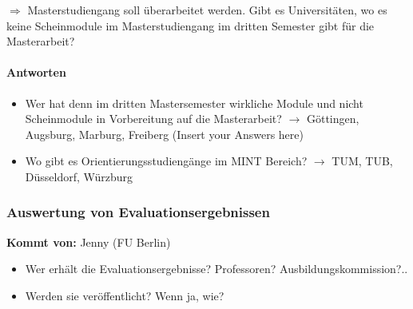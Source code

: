       $\Rightarrow$ Masterstudiengang soll überarbeitet werden. Gibt es Universitäten, wo es keine Scheinmodule im Masterstudiengang im dritten Semester gibt für die Masterarbeit?

      \paragraph{Antworten}
        \begin{itemize}
          \item Wer hat denn im dritten Mastersemester wirkliche Module und nicht Scheinmodule in Vorbereitung auf die Masterarbeit?
            $\rightarrow$ Göttingen, Augsburg, Marburg, Freiberg (Insert your Answers here)
          \item Wo gibt es Orientierungsstudiengänge im MINT Bereich?
            $\rightarrow$ TUM, TUB, Düsseldorf, Würzburg
        \end{itemize}

    \subsubsection{Auswertung von Evaluationsergebnissen}

      \textbf{Kommt von:} Jenny (FU Berlin)

      \begin{itemize}
        \item Wer erhält die Evaluationsergebnisse? Professoren? Ausbildungskommission?..
        \item Werden sie veröffentlicht? Wenn ja, wie?
      \end{itemize}

